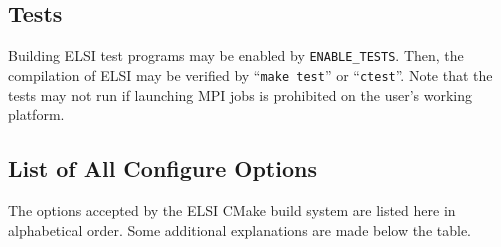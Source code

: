 \documentclass{report}
\begin{document}
\subsection{Tests}
\label{subsec:config_tests}
Building ELSI test programs may be enabled by \texttt{ENABLE\_TESTS}. Then, the compilation of ELSI may be verified by ``\texttt{make test}'' or ``\texttt{ctest}''. Note that the tests may not run if launching MPI jobs is prohibited on the user's working platform.

\subsection{List of All Configure Options}
\label{subsec:config_options}
The options accepted by the ELSI CMake build system are listed here in alphabetical order. Some additional explanations are made below the table.
\end{document}
